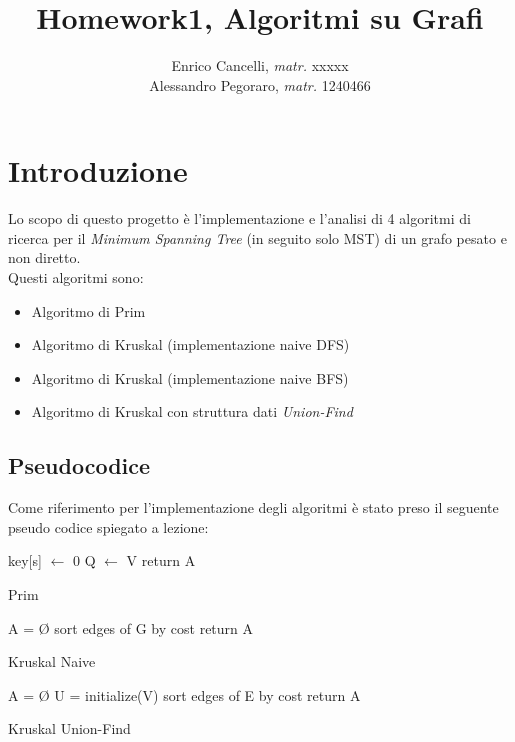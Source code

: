 \documentclass[]{article}
\title{Homework1, Algoritmi su Grafi}
\author{Enrico Cancelli, \textit{matr.} xxxxx\\
		Alessandro Pegoraro, \textit{matr.} 1240466}
\begin{document}
\maketitle \medskip

\section{Introduzione}
Lo scopo di questo progetto è l'implementazione e l'analisi di 4 algoritmi di ricerca per il \textit{Minimum Spanning Tree} (in seguito solo MST) di un grafo pesato e non diretto.\\
Questi algoritmi sono:
\begin{itemize}
	\item Algoritmo di Prim
	\item Algoritmo di Kruskal (implementazione naive DFS)
	\item Algoritmo di Kruskal (implementazione naive BFS)
	\item Algoritmo di Kruskal con struttura dati \textit{Union-Find}
\end{itemize}
\subsection{Pseudocodice}
Come riferimento per l'implementazione degli algoritmi è stato preso il seguente pseudo codice spiegato a lezione:\\
\begin{algorithm}[H]
	\SetAlgoLined
	\DontPrintSemicolon
	key[s] $\gets$ 0\;
	Q $\gets$ V\;
	return A\;
	\caption{Prim}
\end{algorithm}

\begin{algorithm}[H]
	\SetAlgoLined
	\DontPrintSemicolon
	A = Ø\;
	sort edges of G by cost\;
	return A\;
	\caption{Kruskal Naive}
\end{algorithm}

\begin{algorithm}[H]
	\SetAlgoLined
	\DontPrintSemicolon
	A = Ø\;
	U = initialize(V)\;
	sort edges of E by cost\;
	return A\;
	\caption{Kruskal Union-Find}
\end{algorithm}
\end{document}
